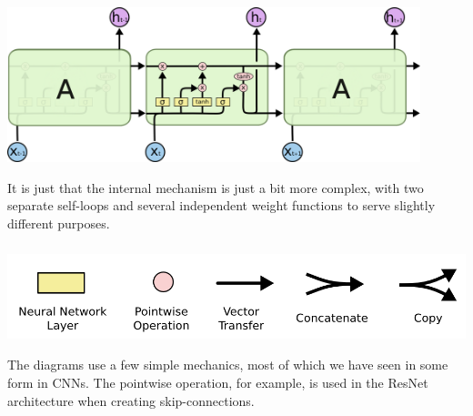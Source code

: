 \documentclass[xetex,mathserif,serif,aspectratio=169]{beamer}
\begin{document}
\begin{frame}[fragile] \frametitle{} \oldB \small

\begin{center}
\includegraphics[height=4.5cm]{img/cloah06.png}
\end{center}

It is just that the internal mechanism is just a bit more
complex, with two separate self-loops and several independent
weight functions to serve slightly different purposes.

\end{frame}

\begin{frame}[fragile] \frametitle{} \oldB \small

\begin{center}
\includegraphics[height=2.5cm]{img/cloah07.png}
\end{center}

The diagrams use a few simple mechanics, most of which
we have seen in some form in CNNs. The pointwise operation,
for example, is used in the ResNet architecture when creating
skip-connections.

\end{frame}
\end{document}
